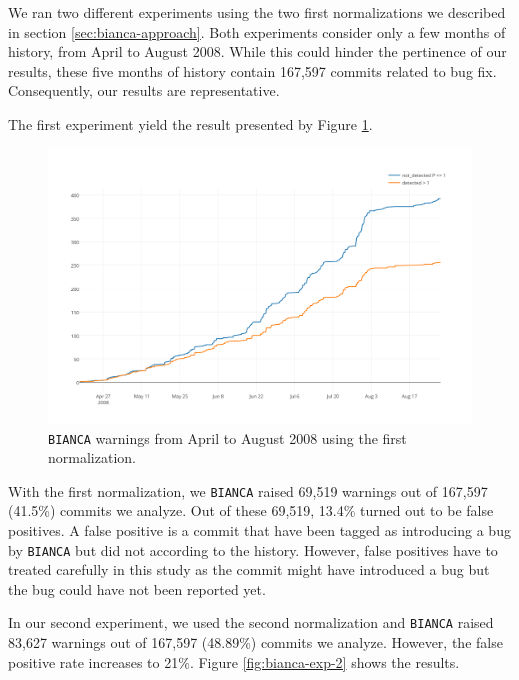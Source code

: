 We ran two different experiments using the two first normalizations we described in section \ref{sec:bianca-approach}. Both experiments consider only a few months of history, from April to August 2008. While this could hinder the pertinence of our results, these five months of history contain 167,597 commits related to bug fix. Consequently, our results are representative.  

The first experiment yield the result presented by Figure \ref{fig:bianca-exp-1}.

\begin{figure}[h!]
  \centering
    \includegraphics[scale=0.55]{media/bianca-13.png}
    \caption{{\tt BIANCA} warnings from April to August 2008 using the first normalization. 
    \label{fig:bianca-exp-1}}
\end{figure}


With the first normalization, we {\tt BIANCA} raised 69,519 warnings out of 167,597 (41.5\%) commits we analyze. Out of these 69,519, 13.4\% turned out to be false positives. A false positive is a commit that have been tagged as introducing a bug by {\tt BIANCA} but did not according to the history. However, false positives have to treated carefully in this study as the commit might have introduced a bug but the bug could have not been reported yet.

In our second experiment, we used the second normalization and {\tt BIANCA} raised 83,627 warnings out of 167,597 (48.89\%) commits we analyze. However, the false positive rate increases to 21\%. Figure \ref{fig:bianca-exp-2} shows the results.

